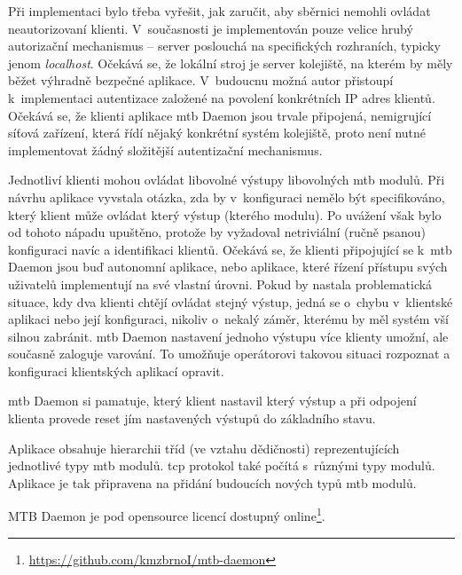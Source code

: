 Při implementaci bylo třeba vyřešit, jak zaručit, aby sběrnici nemohli ovládat
neautorizovaní klienti. V~současnosti je implementován pouze velice hrubý
autorizační mechanismus – server poslouchá na specifických rozhraních,
typicky jenom \textit{localhost}. Očekává se, že lokální stroj je server
kolejiště, na kterém by měly běžet výhradně bezpečné aplikace. V~budoucnu možná
autor přistoupí k~implementaci autentizace založené na povolení konkrétních
IP adres klientů. Očekává se, že klienti aplikace \gls{mtb} Daemon jsou trvale
připojená, nemigrující síťová zařízení, která řídí nějaký konkrétní systém
kolejiště, proto není nutné implementovat žádný složitější autentizační
mechanismus.

Jednotliví klienti mohou ovládat libovolné výstupy libovolných \gls{mtb}
modulů.  Při návrhu aplikace vyvstala otázka, zda by v~konfiguraci nemělo být
specifikováno, který klient může ovládat který výstup (kterého modulu). Po
uvážení však bylo od tohoto nápadu upuštěno, protože by vyžadoval netriviální
(ručně psanou) konfiguraci navíc a identifikaci klientů. Očekává se, že klienti
připojující se k~\gls{mtb} Daemon jsou buď autonomní aplikace, nebo
aplikace, které řízení přístupu svých uživatelů implementují na své vlastní
úrovni. Pokud by nastala problematická situace, kdy dva klienti chtějí ovládat
stejný výstup, jedná se o~chybu v~klientské aplikaci nebo její konfiguraci,
nikoliv o~nekalý záměr, kterému by měl systém vší silnou zabránit. \gls{mtb}
Daemon nastavení jednoho výstupu více klienty umožní, ale současně zaloguje
varování. To umožňuje operátorovi takovou situaci rozpoznat a konfiguraci
klientských aplikací opravit.

\gls{mtb} Daemon si pamatuje, který klient nastavil který výstup a při
odpojení klienta provede reset jím nastavených výstupů do základního stavu.

Aplikace obsahuje hierarchii tříd (ve vztahu dědičnosti) reprezentujících
jednotlivé typy \gls{mtb} modulů. \gls{tcp} protokol také počítá s~různými typy
modulů. Aplikace je tak připravena na přidání budoucích nových typů \gls{mtb}
modulů.

MTB Daemon je pod opensource licencí dostupný
online\footnote{\url{https://github.com/kmzbrnoI/mtb-daemon}}.
